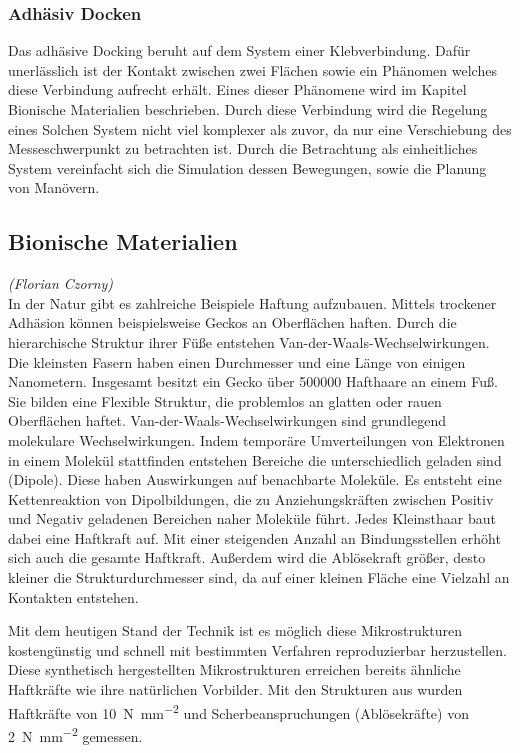 \subsubsection{Adhäsiv Docken}

	Das adhäsive Docking beruht auf dem System einer Klebverbindung. Dafür unerlässlich ist der Kontakt zwischen zwei Flächen sowie ein Phänomen welches diese Verbindung aufrecht erhält. Eines dieser Phänomene wird im Kapitel Bionische Materialien beschrieben. Durch diese Verbindung wird die Regelung eines Solchen System nicht viel komplexer als zuvor, da nur eine Verschiebung des Messeschwerpunkt zu betrachten ist. Durch die Betrachtung als einheitliches System vereinfacht sich die Simulation dessen Bewegungen, sowie die Planung von Manövern.     
						
		
		
		\subsection{Bionische Materialien}
		\hfill\emph{(Florian Czorny)}\\
		In der Natur gibt es zahlreiche Beispiele Haftung aufzubauen. Mittels trockener Adhäsion können beispielsweise Geckos an Oberflächen haften. Durch die hierarchische Struktur ihrer Füße entstehen Van-der-Waals-Wechselwirkungen. Die kleinsten Fasern haben einen Durchmesser und eine Länge von einigen Nanometern. Insgesamt besitzt ein Gecko über \num{500000} Hafthaare an einem Fuß. Sie bilden eine Flexible Struktur, die problemlos an glatten oder rauen Oberflächen haftet. Van-der-Waals-Wechselwirkungen sind grundlegend molekulare Wechselwirkungen. Indem temporäre Umverteilungen von Elektronen in einem Molekül stattfinden entstehen Bereiche die unterschiedlich geladen sind (Dipole). Diese haben Auswirkungen auf benachbarte Moleküle. Es entsteht eine Kettenreaktion von Dipolbildungen, die zu Anziehungskräften zwischen Positiv und Negativ geladenen Bereichen naher Moleküle führt. Jedes Kleinsthaar baut dabei eine Haftkraft auf. Mit einer steigenden Anzahl an Bindungsstellen erhöht sich auch die gesamte Haftkraft. Außerdem wird die Ablösekraft größer, desto kleiner die Strukturdurchmesser sind, da auf einer kleinen Fläche eine Vielzahl an Kontakten entstehen. \cite{Schwerter.} 

Mit dem heutigen Stand der Technik ist es möglich diese Mikrostrukturen kostengünstig und schnell mit bestimmten Verfahren reproduzierbar herzustellen. Diese synthetisch hergestellten Mikrostrukturen erreichen bereits ähnliche Haftkräfte wie ihre natürlichen Vorbilder. Mit den Strukturen aus  wurden Haftkräfte von \SI{10}{\newton\per\square\milli\metre} und Scherbeanspruchungen (Ablösekräfte)  von \SI{2}{\newton\per\square\milli\metre} gemessen.


